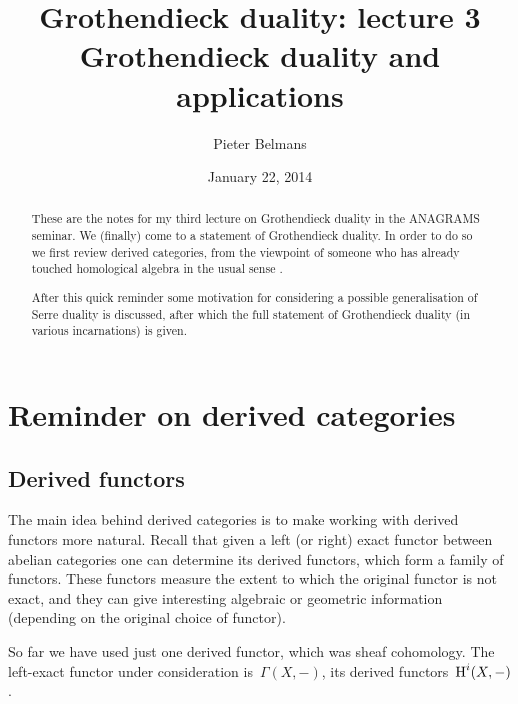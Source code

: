 \documentclass[10pt,a4paper]{article}
\title{Grothendieck duality: lecture 3 \\[.2em] \Large Grothendieck duality and applications}
\author{Pieter Belmans}
\date{January 22, 2014}
\begin{document}
\maketitle

\begin{abstract}
  These are the notes for my third lecture on Grothendieck duality in the ANAGRAMS seminar. We (finally) come to a statement of Grothendieck duality. In order to do so we first review derived categories, from the viewpoint of someone who has already touched homological algebra in the usual sense \cite{weibel-homological-algebra}.

  After this quick reminder some motivation for considering a possible generalisation of Serre duality is discussed, after which the full statement of Grothendieck duality (in various incarnations) is given. 
\end{abstract}

\tableofcontents

\clearpage

\setcounter{section}{-1}
\section{Reminder on derived categories}
\label{section:derived-categories}
\subsection{Derived functors}
The main idea behind derived categories is to make working with derived functors more natural. Recall that given a left (or right) exact functor between abelian categories one can determine its derived functors, which form a family of functors. These functors measure the extent to which the original functor is not exact, and they can give interesting algebraic or geometric information (depending on the original choice of functor).

\begin{example}
  So far we have used just one derived functor, which was sheaf cohomology. The left-exact functor under consideration is~$\Gamma(X,-)$, its derived functors~$\operatorname{H}^i(X,-)$.
\end{example}
\end{document}
